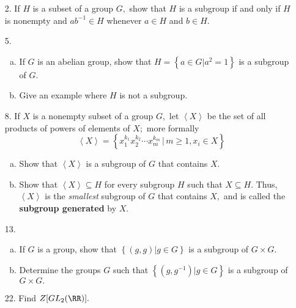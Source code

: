 \documentclass{article}
\begin{document}
\begin{itemize}
	\item[2.] If $H$ is a subset of a group $G,$ show that $H$ is a subgroup if and only if $H$ is nonempty and $ab^{-1}\in H$ whenever $a\in H$ and $b\in H.$

	\item[5.] \begin{enumerate}[(a)]
			\item If $G$ is an abelian group, show that $H=\left\{ a\in G | a^2=1 \right\}$ is a subgroup of $G.$

			\item Give an example where $H$ is not a subgroup.
				
		\end{enumerate}

	\item[8.] If $X$ is a nonempty subset of a group $G,$ let $\left< X\right>$ be the set of all products of powers of elements of $X;$ more formally \[\left< X\right>=\left\{ x_1^{k_1}x_2^{k_2}\cdots x_m^{k_m}\, |\, m\ge 1, x_i\in X \right\}\]
		\begin{enumerate}[(a)]
			\item Show that $\left< X\right>$ is a subgroup of $G$ that contains $X.$

			\item Show that $\left< X\right>\subseteq H$ for every subgroup $H$ such that $X\subseteq H.$ Thus, $\left< X\right>$ is the \textit{smallest} subgroup of $G$ that contains $X,$ and is called the \textbf{subgroup generated} by $X.$
				
		\end{enumerate}

	\item[13.] \begin{enumerate}[(a)]
			\item If $G$ is a group, show that $\left\{ (g, g) | g\in G \right\}$ is a subgroup of $G\times G.$

			\item Determine the groups $G$ such that $\left\{ (g, g^{-1})|g\in G \right\}$ is a subgroup of $G\times G.$
				
		\end{enumerate}

	\item[22.] Find $Z[GL_2(\RR)].$
		
\end{itemize}
\end{document}
